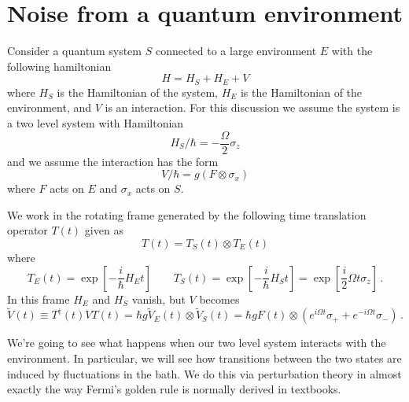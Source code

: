 \section{Noise from a quantum environment}

Consider a quantum system $S$ connected to a large environment $E$ with the following hamiltonian
\begin{equation}
H = H_S + H_E + V
\end{equation}
where $H_S$ is the Hamiltonian of the system, $H_E$ is the Hamiltonian of the environment, and $V$ is an interaction.
For this discussion we assume the system is a two level system with Hamiltonian
\begin{equation}
H_S / \hbar = - \frac{\Omega}{2} \sigma_z
\end{equation}
and we assume the interaction has the form
\begin{equation}
V / \hbar = g \left( F \otimes \sigma_x \right)
\end{equation}
where $F$ acts on $E$ and $\sigma_x$ acts on $S$.

We work in the rotating frame generated by the following time translation operator $T(t)$ given as
\begin{equation}
T(t) = T_S(t) \otimes T_E(t)
\end{equation}
where
\begin{equation}
T_E(t) = \exp \left[ - \frac{i}{\hbar} H_E t \right]
\qquad
T_S(t)
= \exp \left[ - \frac{i}{\hbar} H_S t \right]
= \exp \left[ \frac{i}{2} \Omega t \sigma_z \right] \, .
\end{equation}
In this frame $H_E$ and $H_S$ vanish, but $V$ becomes
\begin{equation}
\tilde{V}(t)
\equiv T^\dagger(t) V T(t)
= \hbar g \tilde{V}_E(t) \otimes \tilde{V}_S(t)
= \hbar g
F(t)
\otimes \left( e^{i \Omega t}\sigma_+ + e^{-i \Omega t} \sigma_- \right) \, .
\end{equation}

We're going to see what happens when our two level system interacts with the environment.
In particular, we will see how transitions between the two states are induced by fluctuations in the bath.
We do this via perturbation theory in almost exactly the way Fermi's golden rule is normally derived in textbooks.





%
